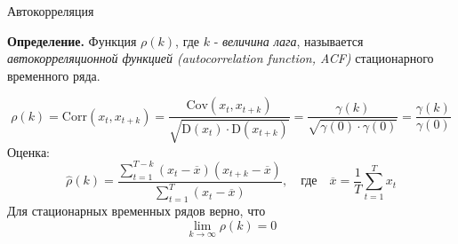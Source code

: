 \begin{frame}{Автокорреляция}

\textbf{Определение.} Функция $\rho(k)$, где $k$ - \textit{величина лага}, называется  \textit{автокорреляционной функцией (autocorrelation function, ACF)} стационарного временного ряда.

\begin{equation*}
    \rho(k) = \mathrm{Corr}(x_t, x_{t+k}) = \frac{ \mathrm{Cov}(x_t,x_{t+k}) }{ \sqrt{ \mathrm{D}(x_t) \cdot \mathrm{D}(x_{t+k}) } } = \frac{ \gamma(k) }{ \sqrt{ \gamma(0) \cdot \gamma(0) } } = \frac{ \gamma(k) }{ \gamma(0)}
\end{equation*}
Оценка:
\begin{equation*}
    \hat{\rho}(k) = \frac{ \sum_{t=1}^{T-k}(x_t - \overline{x})(x_{t+k} - \overline{x})}{\sum_{t=1}^{T}(x_t - \overline{x})}, 
    \quad\text{где}\quad\overline{x} = \frac{1}{T}\sum_{t=1}^{T}x_t
\end{equation*}
Для стационарных временных рядов верно, что
\begin{equation*}
    \lim_{k \to \infty} \rho(k) = 0
\end{equation*}


\end{frame}
